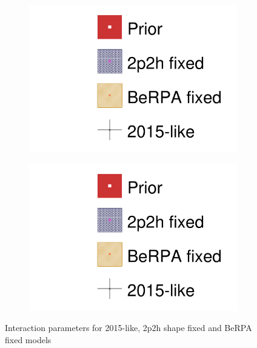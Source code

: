 \begin{figure}[h]
		\begin{subfigure}[t]{0.49\textwidth}
			\includegraphics[width=\textwidth, trim={0mm 0mm 0mm 0mm}, clip,page=20]{figures/mach3/data/alt/2017b_NewData_NewDet_hpc_2p2hshapeFix_0_2017b_NewData_NewDet_hpc_BeRPAfix_0_2017b_NewData_NewDet_hpc_2015like_0.pdf}
		\end{subfigure}
		\begin{subfigure}[t]{0.49\textwidth}
			\includegraphics[width=\textwidth, trim={0mm 0mm 0mm 0mm}, clip,page=21]{figures/mach3/data/alt/2017b_NewData_NewDet_hpc_2p2hshapeFix_0_2017b_NewData_NewDet_hpc_BeRPAfix_0_2017b_NewData_NewDet_hpc_2015like_0.pdf}
	\end{subfigure}
	\caption{Interaction parameters for 2015-like, 2p2h shape fixed and BeRPA fixed models}
	\label{fig:2015like_berpa_2p2h_comp_xsec}
\end{figure}

